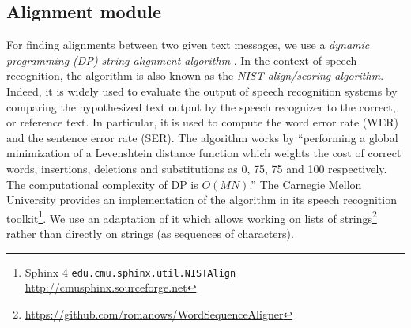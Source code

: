 \subsection{Alignment module}
\label{secalignmentmodule}

For finding alignments between two given text messages, we use a \textit{dynamic programming (DP) string alignment algorithm} \cite{sankoff:1983}.
% 
In the context of speech recognition, the algorithm is also known as the \textit{NIST align/scoring algorithm}. Indeed, it is widely used to evaluate the output of speech recognition systems by comparing the hypothesized text output by the speech recognizer to the correct, or reference text. 
% 
In particular, it is used to compute the word error rate (WER) and the sentence error rate (SER).
% 
The algorithm works by ``performing a global minimization of a Levenshtein distance function which weights the cost of correct words, insertions, deletions and substitutions as 0, 75, 75 and 100 respectively. The computational complexity of DP is $O(MN)$.''
% 
The Carnegie Mellon University provides an implementation of the algorithm in its speech recognition toolkit\footnote{Sphinx 4 \texttt{edu.cmu.sphinx.util.NISTAlign} \url{http://cmusphinx.sourceforge.net}}.
%
We use an adaptation of it which allows working on lists of strings\footnote{\url{https://github.com/romanows/WordSequenceAligner}} rather than directly on strings (as sequences of characters).